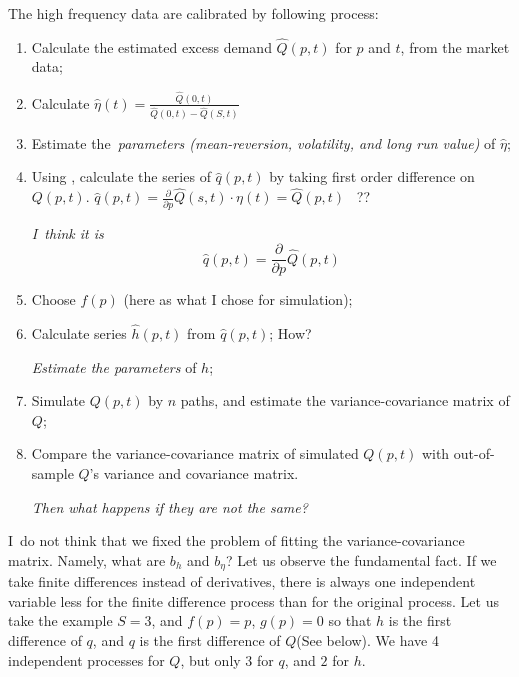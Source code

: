 \documentclass{article}
\begin{document}
The high frequency data are calibrated by following process:

\begin{enumerate}
\item Calculate the estimated excess demand $\hat{Q}(p,t)$ for $p$ and $t$,
from the market data;

\item Calculate $\hat{\eta}(t)=\frac{\hat{Q}(0,t)}{\hat{Q}(0,t)-\hat{Q}(S,t)}
$

\item Estimate the\textit{\ parameters (mean-reversion, volatility, and long
run value) }of $\hat{\eta}$;

\item Using \cite{equ_Q_A}, calculate the series of $\hat{q}(p,t)$ by taking
first order difference on $Q(p,t)$. \newline
$\hat{q}(p,t)=\frac{\partial }{\partial p}\hat{Q}(s,t)\cdot \eta (t)=\hat{Q}%
(p,t)$ \ ??

\textit{I\ think it is}%
\begin{equation*}
\hat{q}(p,t)=\frac{\partial }{\partial p}\hat{Q}(p,t)
\end{equation*}

\item Choose $f(p)$ (here as what I chose for simulation);

\item Calculate series $\hat{h}(p,t)$ from $\hat{q}(p,t)$; How?

\textit{Estimate the parameters} of $h$;

\item Simulate $Q(p,t)$ by $n$ paths, and estimate the variance-covariance
matrix of $Q$;

\item Compare the variance-covariance matrix of simulated $Q(p,t)$ with
out-of-sample $Q$'s variance and covariance matrix.

\textit{Then what happens if they are not the same?}
\end{enumerate}

I\ do not think that we fixed the problem of fitting the variance-covariance
matrix. Namely, what are $b_{h}$ and $b_{\eta }$? Let us observe the
fundamental fact. If we take finite differences instead of derivatives,
there is always one independent variable less for the finite difference
process than for the original process. Let us take the example $S=3$, and $%
f(p)=p$, $g(p)=0$ so that $h$ is the first difference of $q$, and $q$ is the
first difference of $Q$(See below). We have 4 independent processes for $Q$,
but only $3$ for $q$, and $2$ for $h$.
\end{document}
